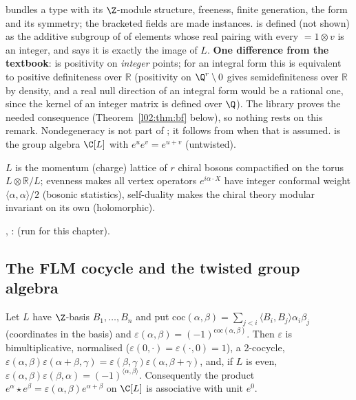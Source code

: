 \begin{dictionary}
 bundles a type with its $\Z$-module structure, freeness, finite generation, the
form and its symmetry; the bracketed fields are made instances.  is defined (not shown) as
the additive subgroup of  of elements whose real pairing with every
 $= 1\otimes v$ is an integer, and  says it is exactly the image of $L$.
\textbf{One difference from the textbook}:  is positivity on \emph{integer} points; for an
integral form this is equivalent to positive definiteness over $\mathbb{R}$ (positivity on $\Q^r\setminus0$
gives semidefiniteness over $\mathbb{R}$ by density, and a real null direction of an integral form would be
a rational one, since the kernel of an integer matrix is defined over $\Q$). The library proves the
needed consequence (Theorem~\ref{l02:thm:bf} below), so nothing rests on this remark. Nondegeneracy is
not part of ; it follows from  when that is assumed.
 is the group algebra $\C[L]$ with $e^ue^v = e^{u+v}$ (untwisted).
\end{dictionary}

\begin{physics}
$L$ is the momentum (charge) lattice of $r$ chiral bosons compactified on the torus
$L\otimes\mathbb{R}/L$; evenness makes all vertex operators $e^{i\alpha\cdot X}$ have integer conformal weight
$\langle\alpha,\alpha\rangle/2$ (bosonic statistics), self-duality makes the chiral theory modular invariant on its
own (holomorphic).
\end{physics}

\begin{status}
\allowbreak{}\allowbreak{}\allowbreak{}, \allowbreak{}\allowbreak{}:  (run for this chapter).
\end{status}

\subsection{The FLM cocycle and the twisted group algebra}

\begin{theorem}\label{l02:thm:cocycle}
Let $L$ have $\Z$-basis $B_1,\dots,B_n$ and put
$\mathrm{coc}(\alpha,\beta) = \sum_{j<i}\langle B_i,B_j\rangle\alpha_i\beta_j$ (coordinates in the basis) and
$\varepsilon(\alpha,\beta) = (-1)^{\mathrm{coc}(\alpha,\beta)}$. Then $\varepsilon$ is bimultiplicative, normalised
($\varepsilon(0,\cdot) = \varepsilon(\cdot,0) = 1$), a 2-cocycle,
$\varepsilon(\alpha,\beta)\varepsilon(\alpha+\beta,\gamma) = \varepsilon(\beta,\gamma)\varepsilon(\alpha,\beta+\gamma)$, and, if $L$ is
even, $\varepsilon(\alpha,\beta)\varepsilon(\beta,\alpha) = (-1)^{\langle\alpha,\beta\rangle}$. Consequently the product
$e^\alpha\star e^\beta = \varepsilon(\alpha,\beta)e^{\alpha+\beta}$ on $\C[L]$ is associative with unit $e^0$.
\end{theorem}

